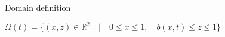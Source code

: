 


\begin{frame}{Domain definition}



$\Omega(t)=\{ (x,z) \in \mathbb{R}^{2} \quad | \quad 0 \leq  x \leq 1, \quad b(x,t) \leq z \leq 1 \}$  

\begin{figure}[h!]\center

\label{notations}
\end{figure}
%

\end{frame}


